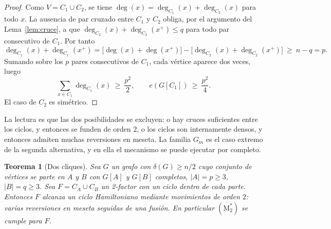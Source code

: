 \documentclass[11pt,a4paper]{article}
\newtheorem{teorema}{Teorema}[section]
\theoremstyle{definition}
\theoremstyle{remark}
\begin{document}
\begin{proof}
Como $V=C_1\cup C_2$, se tiene $\deg(x)=\deg_{C_1}(x)+\deg_{C_2}(x)$ para todo $x$. La ausencia de par cruzado entre $C_1$ y $C_2$ obliga, por el argumento del Lema~\ref{lem:cruce}, a que $\deg_{C_2}(x)+\deg_{C_2}(x^+)\le q$ para todo par consecutivo de $C_1$. Por tanto
\[
\deg_{C_1}(x)+\deg_{C_1}(x^+)=\big[\deg(x)+\deg(x^+)\big]-\big[\deg_{C_2}(x)+\deg_{C_2}(x^+)\big]\ \ge\ n-q=p .
\]
Sumando sobre los $p$ pares consecutivos de $C_1$, cada vértice aparece dos veces, luego
\[
\sum_{x\in C_1}\deg_{C_1}(x)\ \ge\ \frac{p^2}{2},
\qquad e(G[C_1])\ \ge\ \frac{p^2}{4}.
\] El caso de $C_2$ es simétrico.
\end{proof}

La lectura es que las dos posibilidades se excluyen: o hay cruces suficientes entre los ciclos, y entonces se funden de orden $2$, o los ciclos son internamente densos, y entonces admiten muchas reversiones en meseta. La familia $G_m$ es el caso extremo de la segunda alternativa, y en ella el mecanismo se puede ejecutar por completo.

\begin{teorema}[Dos cliques]\label{thm:doscliques}
Sea $G$ un grafo con $\delta(G)\ge n/2$ cuyo conjunto de vértices se parte en $A$ y $B$ con $G[A]$ y $G[B]$ completos, $|A|=p\ge3$, $|B|=q\ge3$. Sea $F=C_A\cup C_B$ un 2-factor con un ciclo dentro de cada parte. Entonces $F$ alcanza un ciclo Hamiltoniano mediante movimientos de orden $2$: varias reversiones en meseta seguidas de una fusión. En particular $(\mathrm{M}^*_2)$ se cumple para $F$.
\end{teorema}
\end{document}
